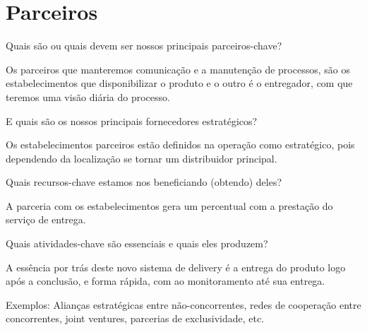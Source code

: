 \section{\textbf{Parceiros}}
\label{sec: Parceiros}

\begin{commentA} \vspace{0.3cm} \noindent Quais são ou quais devem ser nossos principais parceiros-chave? \par \vspace{0.1cm} \end{commentA}


Os parceiros que manteremos comunicação e a manutenção de processos, são os estabelecimentos que disponibilizar o produto e o outro é o entregador, com que teremos uma visão diária do processo.\par

\begin{commentA} \vspace{0.3cm} \noindent E quais são os nossos principais fornecedores estratégicos? \par \vspace{0.1cm} \end{commentA}


Os estabelecimentos parceiros estão definidos na operação como estratégico, pois dependendo da localização se tornar um distribuidor principal.\par

\begin{commentA} \vspace{0.3cm} \noindent Quais recursos-chave estamos nos beneficiando (obtendo) deles? \par \vspace{0.1cm} \end{commentA}


A parceria com os estabelecimentos gera um percentual com a prestação do serviço de entrega.\par

\begin{commentA} \vspace{0.3cm} \noindent Quais atividades-chave são essenciais e quais eles produzem? \par \vspace{0.1cm} \end{commentA}


A essência por trás deste novo sistema de delivery é a entrega do produto logo após a conclusão, e forma rápida, com ao monitoramento até sua entrega.\par

\begin{commentA} \vspace{0.3cm} \noindent Exemplos:
Alianças estratégicas entre não-concorrentes, redes de cooperação entre concorrentes, joint ventures, parcerias de exclusividade, etc.
\par \vspace{0.1cm} \end{commentA}

